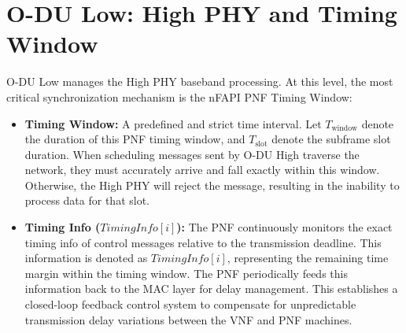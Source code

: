 \documentclass[../my_ntust_thesis.tex]{subfiles}
\begin{document}

\section{O-DU Low: High PHY and Timing Window}
\label{subsec:C_odu_low}
O-DU Low manages the High PHY baseband processing. At this level, the most critical synchronization mechanism is the nFAPI PNF Timing Window:
\begin{itemize}
\item \textbf{Timing Window:} A predefined and strict time interval. Let $T_{\mathrm{window}}$ denote the duration of this PNF timing window, and $T_{\mathrm{slot}}$ denote the subframe slot duration. When scheduling messages sent by O-DU High traverse the network, they must accurately arrive and fall exactly within this window. Otherwise, the High PHY will reject the message, resulting in the inability to process data for that slot.
\item \textbf{Timing Info ($\mathit{TimingInfo}[i]$):} The PNF continuously monitors the exact timing info of control messages relative to the transmission deadline. This information is denoted as $\mathit{TimingInfo}[i]$, representing the remaining time margin within the timing window. The PNF periodically feeds this information back to the MAC layer for delay management. This establishes a closed-loop feedback control system to compensate for unpredictable transmission delay variations between the VNF and PNF machines.
\end{itemize}

\end{document}
